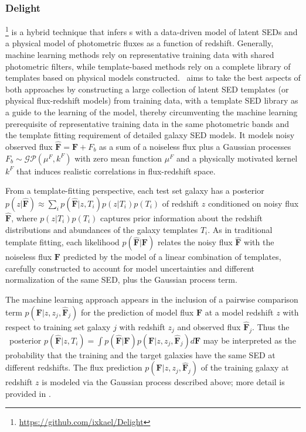 \subsubsection{Delight}

\delight \footnote{\url{https://github.com/ixkael/Delight}} \citep{leistedt_data-driven_2017} is a hybrid technique that infers \pz s with a data-driven model of latent SEDs and a physical model of photometric fluxes as a function of redshift.
Generally, machine learning methods rely on representative training data with shared photometric filters, while template-based methods rely on a complete library of templates based on physical models constructed.
\delight\ aims to take the best aspects of both approaches by constructing a large collection of latent SED templates (or physical flux-redshift models) from training data, with a template SED library as a guide to the learning of the model, thereby circumventing the machine learning prerequisite of representative training data in the same photometric bands and the template fitting requirement of detailed galaxy SED models.
It models noisy observed flux $\mathbf{\hat{F}} = \mathbf{F} + F_{b}$ as a sum of a noiseless flux plus a Gaussian processes $F_b \sim \mathcal{GP}\left(\mu^F, k^F \right)$ with zero mean function $\mu^{F}$ and a physically motivated kernel $k^{F}$ that induces realistic correlations in flux-redshift space.

From a template-fitting perspective, each test set galaxy has a posterior $p(z \vert \mathbf{\hat{F}}) \approx \sum_i p(\mathbf{\hat{F}} \vert z, T_i) p(z \vert T_i) p(T_i)$ of redshift $z$ conditioned on noisy flux $\mathbf{\hat{F}}$, where $p(z \vert T_i) p(T_i)$ captures prior information about the redshift distributions and abundances of the galaxy templates $T_i$.
As in traditional template fitting, each likelihood $p(\mathbf{\hat{F}} \vert \mathbf{F})$ relates the noisy flux $\mathbf{\hat{F}}$ with the noiseless flux $\mathbf{F}$ predicted by the model of a linear combination of templates, carefully constructed to account for model uncertainties and different normalization of the same SED, plus the Gaussian process term.

The machine learning approach appears in the inclusion of a pairwise comparison term $p(\mathbf{F} \vert z, z_j, \mathbf{\hat{F}}_j)$ for the prediction of model flux $\mathbf{F}$ at a model redshift $z$ with respect to training set galaxy $j$ with redshift $z_j$ and observed flux $\mathbf{\hat{F}}_j$.
Thus the \pz\ posterior $p(\mathbf{\hat{F}} \vert z, T_i) = \int p(\mathbf{\hat{F}} \vert \mathbf{F}) p(\mathbf{F} \vert z, z_j, \mathbf{\hat{F}}_j) d\mathbf{F}$ may be interpreted as the probability that the training and the target galaxies have the same SED at different redshifts.
The flux prediction $p(\mathbf{F} \vert z, z_j, \mathbf{\hat{F}}_j)$ of the training galaxy at redshift $z$ is modeled via the Gaussian process described above; more detail is provided in \citet{leistedt_data-driven_2017}.

